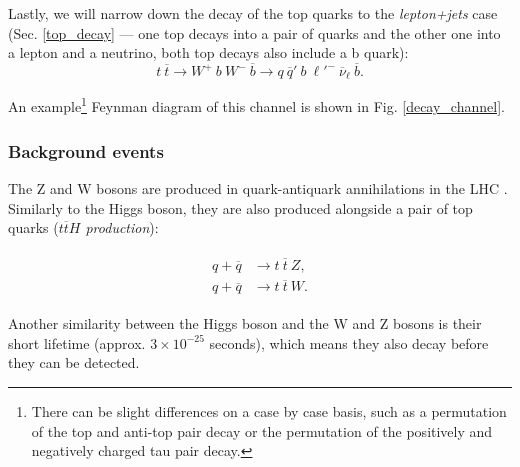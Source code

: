 \documentclass{ctuthesis}
\begin{document}
Lastly, we will narrow down the decay of the top quarks to the \emph{lepton+jets} case (Sec. \ref{top_decay} — one top decays into a pair of quarks and the other one into a lepton and a neutrino, both top decays also include a b quark):
\begin{equation}
\label{tt_decay}
t\:\overline{t} \rightarrow W^{+} \: b \: W^{-} \: \overline{b} \rightarrow  q \: \overline{q}' \: b \: \ell'^{-} \: \overline{\nu}_{\ell} \: \overline{b}.
\end{equation}

An example\footnote{There can be slight differences on a case by case basis, such as a permutation of the top and anti-top pair decay or the permutation of the positively and negatively charged tau pair decay.} Feynman diagram of this channel is shown in Fig. \ref{decay_channel}.

\begin{figure}[h]
\end{figure}

\subsubsection{Background events}
The Z and W bosons are produced in quark-antiquark annihilations in the LHC \cite{W_Z_production}. Similarly to the Higgs boson, they are also produced alongside a pair of top quarks (\emph{$t\overline{t}H$ production}):

\begin{align}
\begin{split}
q + \overline{q} &\rightarrow t\: \overline{t} \: Z, \\
q + \overline{q} &\rightarrow t\: \overline{t} \: W.
\end{split}
\end{align}

Another similarity between the Higgs boson and the W and Z bosons is their short lifetime (approx. $3 \times 10^{-25}$ seconds), which means they also decay before they can be detected.
\end{document}
